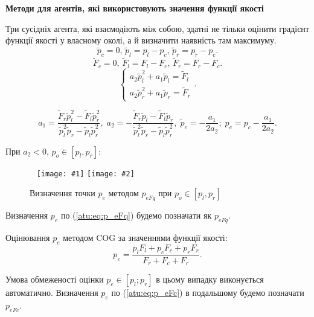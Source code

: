 \documentclass[14pt,handout,utf8]{beamer}
\newcommand{\Xhead}[1]{
 \begin{center}%
      \textbf{#1}%
 \end{center}%
}
\newcommand{\PicDoubleNL}[2]{%
 \begin{center}
    ~ \hfill
    \texttt{[image: \#1]}
    \hfill
    \texttt{[image: \#2]}
    \hfill ~
  \end{center}
}
\begin{document}
\begin{frame}
  \frametitle{~}

  \Xhead{Методи для агентів, які використовують значення функції якості}

  Три сусідніх агента, які взаємодіють між собою, здатні не тільки оцінити градієнт
  функції якості у власному околі, а й визначити наявність там
  максимуму.
  \[
    \tilde{p}_c = 0, \,
    \tilde{p}_l = p_l - p_c, \,
    \tilde{p}_r = p_r - p_c.
  \]
  \[
    \tilde{F}_c = 0, \,
    \tilde{F}_l = F_l - F_c, \,
    \tilde{F}_r = F_r - F_c.
  \]
    \[
    \left\{
      \begin{array}{l}
        a_2 \tilde{p}_l^2 + a_1 \tilde{p}_l  = \tilde{F}_l
        \\
        a_2 \tilde{p}_r^2 + a_1 \tilde{p}_r  = \tilde{F}_r
      \end{array}
    \right. .
  \]

  \begin{equation}
    a_1 = \frac{\tilde{F}_r \tilde{p}_l^2 - \tilde{F}_l \tilde{p}_r^2 }
              { \tilde{p}_l^2 \tilde{p}_r  - \tilde{p}_l \tilde{p}_r^2 },
    \;
    a_2 = - \frac{\tilde{F}_r \tilde{p}_l - \tilde{F}_l \tilde{p}_r }
               { \tilde{p}_l^2 \tilde{p}_r  - \tilde{p}_l \tilde{p}_r^2 },
    \;
    \tilde{p}_e = - \frac{a_1}{2 a_2};
    \;
    p_e = p_c - \frac{a_1}{2 a_2}.
    \label{atu:eq:p_eFq}
  \end{equation}

  При $a_2<0$, $p_o \in [p_l,p_r]$:

  \begin{figure}
    \PicDoubleNL{../p3/p/p_eFq/q_p_eFq_p49_xl.png}{../p3/p/p_eFq/q_p_eFq_p70_xl.png}
    \caption{Визначення точки $p_e$ методом $p_{eFq}$ при $p_o \in [p_l, p_r]$}
    \label{atu:f:p_eFq_intra}
  \end{figure}

  Визначення $p_e$ по (\ref{atu:eq:p_eFq}) будемо позначати як $p_{eFq}$.

  Оцінювання $p_e$ методом COG за значеннями функції якості:
 \begin{equation}
   p_e =
   \frac{p_l F_l + p_c F_c + p_r F_r}{ F_r + F_c + F_r}  .
   \label{atu:eq:p_eFc}
 \end{equation}

Умова обмеженості оцінки $p_e \in [p_l; p_r]$ в цьому випадку виконується
автоматично. Визначення $p_e$ по (\ref{atu:eq:p_eFc}) в подальшому будемо позначати $p_{eFc}$.

\end{frame}
\end{document}
